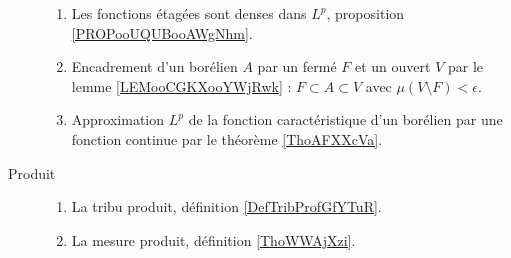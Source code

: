 \begin{description}
\begin{enumerate}
			\item
			      Les fonctions étagées sont denses dans \( L^p\), proposition \ref{PROPooUQUBooAWgNhm}.
			\item
			      Encadrement d'un borélien \( A\) par un fermé \( F\) et un ouvert \( V\) par le lemme \ref{LEMooCGKXooYWjRwk} : \( F\subset A\subset V\) avec \( \mu(V\setminus F)<\epsilon\).
			\item
			      Approximation \( L^p\) de la fonction caractéristique d'un borélien par une fonction continue par le théorème \ref{ThoAFXXcVa}.
		\end{enumerate}
	\item[Produit]
		\begin{enumerate}
			\item
			      La tribu produit, définition \ref{DefTribProfGfYTuR}.
			\item
			      La mesure produit, définition \ref{ThoWWAjXzi}.
		\end{enumerate}
\end{description}
